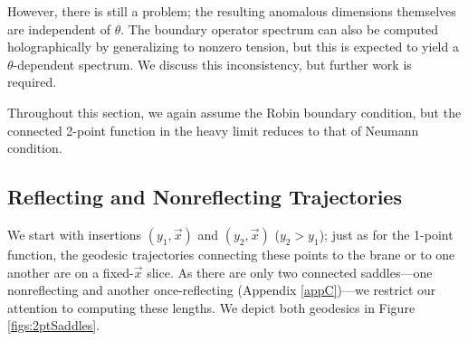 \documentclass[reprint,amsmath,amssymb,aps,nofootinbib,twocolumn]{revtex4-2}
\begin{document}
However, there is still a problem; the resulting anomalous dimensions themselves are independent of $\theta$. The boundary operator spectrum can also be computed holographically by generalizing \cite{aharony_defect_2003} to nonzero tension, but this is expected to yield a $\theta$-dependent spectrum. We discuss this inconsistency, but further work is required.

Throughout this section, we again assume the Robin boundary condition, but the connected 2-point function in the heavy limit reduces to that of Neumann condition.

\subsection{Reflecting and Nonreflecting Trajectories}

We start with insertions $(y_1,\vec{x})$ and $(y_2,\vec{x})$ ($y_2 > y_1$); just as for the 1-point function, the geodesic trajectories connecting these points to the brane or to one another are on a fixed-$\vec{x}$ slice. As there are only two connected saddles---one nonreflecting and another once-reflecting (Appendix \ref{appC})---we restrict our attention to computing these lengths. We depict both geodesics in Figure \ref{figs:2ptSaddles}.
\end{document}
